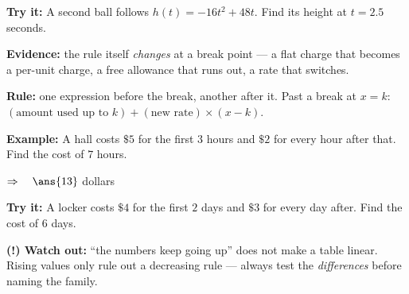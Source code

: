 \documentclass[12pt]{article}
\begin{document}
\begin{tryitbox}
\textbf{Try it:} \quad A second ball follows $h(t) = -16t^2 + 48t$. Find its height at $t = 2.5$ seconds.\\[2pt]
\end{tryitbox}


\begin{formulabox}
\textbf{Evidence:} the rule itself \emph{changes} at a break point --- a flat charge that becomes a per-unit charge, a free allowance that runs out, a rate that switches.\par
\textbf{Rule:} one expression before the break, another after it. Past a break at $x = k$: $(\text{amount used up to } k) + (\text{new rate}) \times (x - k)$.
\end{formulabox}

\begin{examplebox}
\textbf{Example:} \quad A hall costs $\$5$ for the first $3$ hours and $\$2$ for every hour after that. Find the cost of $7$ hours.

$\Rightarrow\quad \ans{13}$ dollars
\end{examplebox}

\begin{tryitbox}
\textbf{Try it:} \quad A locker costs $\$4$ for the first $2$ days and $\$3$ for every day after. Find the cost of $6$ days.\\[2pt]
\end{tryitbox}

\begin{watchoutbox}
\textbf{(!) Watch out:} ``the numbers keep going up'' does not make a table linear. Rising values only rule out a decreasing rule --- always test the \emph{differences} before naming the family.
\end{watchoutbox}
\end{document}
